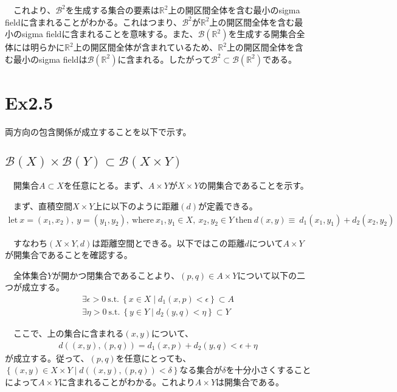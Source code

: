 \documentclass{article}
\begin{document}
　これより、$\mathcal{B}^2$を生成する集合の要素は$\mathbb{R}^2$上の開区間全体を含む最小のsigma fieldに含まれることがわかる。これはつまり、$\mathcal{B}^2$が$\mathbb{R}^2$上の開区間全体を含む最小のsigma fieldに含まれることを意味する。また、$\mathcal{B} \left(\mathbb{R}^2 \right)$を生成する開集合全体には明らかに$\mathbb{R}^2$上の開区間全体が含まれているため、$\mathbb{R}^2$上の開区間全体を含む最小のsigma fieldは$\mathcal{B} \left(\mathbb{R}^2 \right)$に含まれる。したがって$\mathcal{B}^2 \subset \mathcal{B} \left(\mathbb{R}^2 \right)$である。



\section{Ex2.5}
両方向の包含関係が成立することを以下で示す。

\subsection{$\mathcal{B}(X)\times\mathcal{B}(Y) \subset \mathcal{B}(X\times Y)$}

　開集合$A\subset X$を任意にとる。まず、$A \times Y$が$X\times Y$の開集合であることを示す。

　まず、直積空間$X \times Y$上に以下のように距離$(d)$が定義できる。
\begin{align*}
	\text{let}\ x = (x_1, x_2),\ y = (y_1,y_2),\ \text{where}\ x_1,y_1\in X,\ x_2,y_2\in Y\ \text{then}\ d(x,y) \equiv\ d_1(x_1,y_1)+d_2(x_2,y_2)
\end{align*}

　すなわち$(X\times Y, d)$は距離空間とできる。以下ではこの距離$d$について$A \times Y$が開集合であることを確認する。

　全体集合$Y$が開かつ閉集合であることより、$(p,q)\in A\times Y$について以下の二つが成立する。
\begin{align*}
	\exists \epsilon >0\ \text{s.t.}\ \left\{ x\in X\mid d_1(x,p) < \epsilon \right\} \subset A\\
	\exists \eta >0\ \text{s.t.}\ \left\{ y\in Y\mid d_2(y,q) < \eta \right\} \subset Y
\end{align*}

　ここで、上の集合に含まれる$(x,y)$について、
\begin{align*}
	d((x,y), (p,q)) = d_1(x,p) + d_2(y, q) < \epsilon + \eta
\end{align*}
が成立する。従って、$(p,q)$を任意にとっても、$\left\{ (x, y)\in X\times Y\mid d((x,y),(p,q)) < \delta \right\}$なる集合が$\delta$を十分小さくすることによって$A\times Y$に含まれることがわかる。これより$A\times Y$は開集合である。
\end{document}
